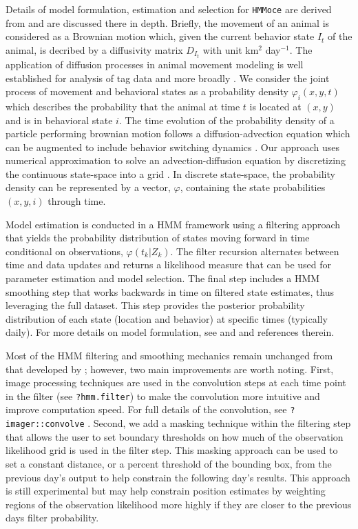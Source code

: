 Details of model formulation, estimation and selection for \texttt{HMMoce} are derived from \citet{Pedersen2011} and are discussed there in depth. Briefly, the movement of an animal is considered as a Brownian motion which, given the current behavior state $I_t$ of the animal, is decribed by a diffusivity matrix $D_{I_t}$ with unit km$^2$ day$^{-1}$. The application of diffusion processes in animal movement modeling is well established for analysis of tag data \citep[e.g.][]{Sibert2003, Pedersen2008} and more broadly \citep{Okubo2013}. We consider the joint process of movement and behavioral states as a probability density $\varphi_i(x,y,t)$ which describes the probability that the animal at time $t$ is located at $(x, y)$ and is in behavioral state $i$. The time evolution of the probability density of a particle performing brownian motion follows a diffusion-advection equation which can be augmented to include behavior switching dynamics \citep[see Eqn. 1,][]{Pedersen2011a}. Our approach uses numerical approximation to solve an advection-diffusion equation by discretizing the continuous state-space into a grid \citep{Thygesen2009a}. In discrete state-space, the probability density can be represented by a vector, $\varphi$, containing the state probabilities $(x,y,i)$ through time.

Model estimation is conducted in a HMM framework using a filtering approach \citep{Zucchini2009} that yields the probability distribution of states moving forward in time conditional on observations, $\varphi(t_k | Z_k)$. The filter recursion alternates between time and data updates and returns a likelihood measure that can be used for parameter estimation and model selection. The final step includes a HMM smoothing step \citep{Thygesen2009a} that works backwards in time on filtered state estimates, thus leveraging the full dataset. This step provides the posterior probability distribution of each state (\eg location and behavior) at specific times (typically daily). For more details on model formulation, see \citet{Pedersen2008} and \citet{Pedersen2011a} and references therein.

Most of the HMM filtering and smoothing mechanics remain unchanged from that developed by \citet{Pedersen2008}; however, two main improvements are worth noting. First, image processing techniques are used in the convolution steps at each time point in the filter (see \texttt{?hmm.filter}) to make the convolution more intuitive and improve computation speed. For full details of the convolution, see \texttt{?imager::convolve} \citep{Barthelme2016}. Second, we add a masking technique within the filtering step that allows the user to set boundary thresholds on how much of the observation likelihood grid is used in the filter step. This masking approach can be used to set a constant distance, or a percent threshold of the bounding box, from the previous day's output to help constrain the following day's results. This approach is still experimental but may help constrain position estimates by weighting regions of the observation likelihood more highly if they are closer to the previous days filter probability.

